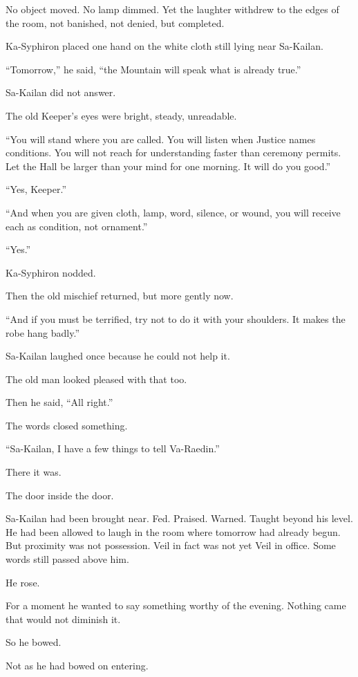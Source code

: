 No object moved. No lamp dimmed. Yet the laughter withdrew to the edges of the room, not banished, not denied, but completed.\par
Ka-Syphiron placed one hand on the white cloth still lying near Sa-Kailan.\par
“Tomorrow,” he said, “the Mountain will speak what is already true.”\par
Sa-Kailan did not answer.\par
The old Keeper’s eyes were bright, steady, unreadable.\par
“You will stand where you are called. You will listen when Justice names conditions. You will not reach for understanding faster than ceremony permits. Let the Hall be larger than your mind for one morning. It will do you good.”\par
“Yes, Keeper.”\par
“And when you are given cloth, lamp, word, silence, or wound, you will receive each as condition, not ornament.”\par
“Yes.”\par
Ka-Syphiron nodded.\par
Then the old mischief returned, but more gently now.\par
“And if you must be terrified, try not to do it with your shoulders. It makes the robe hang badly.”\par
Sa-Kailan laughed once because he could not help it.\par
The old man looked pleased with that too.\par
Then he said, “All right.”\par
The words closed something.\par
“Sa-Kailan, I have a few things to tell Va-Raedin.”\par
There it was.\par
The door inside the door.\par
Sa-Kailan had been brought near. Fed. Praised. Warned. Taught beyond his level. He had been allowed to laugh in the room where tomorrow had already begun. But proximity was not possession. Veil in fact was not yet Veil in office. Some words still passed above him.\par
He rose.\par
For a moment he wanted to say something worthy of the evening. Nothing came that would not diminish it.\par
So he bowed.\par
Not as he had bowed on entering.\par
